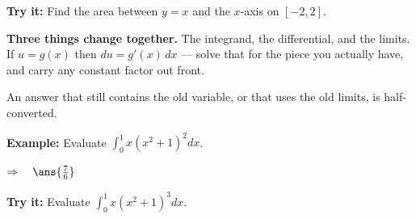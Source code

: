 \documentclass[12pt]{article}
\begin{document}
\begin{tryitbox}
\textbf{Try it:} \quad Find the area between $y = x$ and the $x$-axis on
$[-2, 2]$.\\[2pt]
\end{tryitbox}


\begin{formulabox}
\textbf{Three things change together.} The integrand, the differential, and the
limits. If $u = g(x)$ then $du = g'(x)\,dx$ --- solve that for the piece you
actually have, and carry any constant factor out front.\par
An answer that still contains the old variable, or that uses the old limits, is
half-converted.
\end{formulabox}

\begin{examplebox}
\textbf{Example:} \quad Evaluate $\displaystyle\int_0^1 x\left(x^2+1\right)^2dx$.

$\Rightarrow\quad \ans{\tfrac{7}{6}}$
\end{examplebox}

\begin{tryitbox}
\textbf{Try it:} \quad Evaluate $\displaystyle\int_0^1 x\left(x^2+1\right)^3dx$.\\[2pt]
\end{tryitbox}
\end{document}
